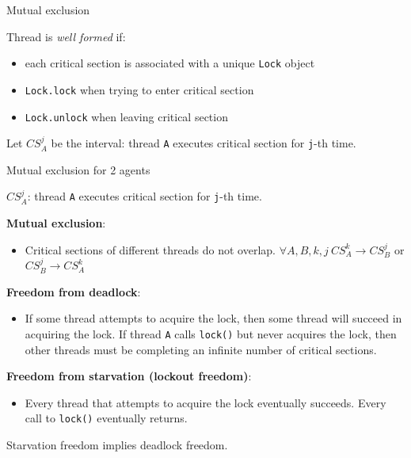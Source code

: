 \begin{frame}[t]{Mutual exclusion}

Thread is \textit{well formed} if:
\begin{itemize}
  \item each critical section is associated with a unique \texttt{Lock} object
  \item \texttt{Lock.lock} when trying to enter critical section
  \item \texttt{Lock.unlock} when leaving critical section
\end{itemize}

Let $CS_{A}^{j}$ be the interval: thread \texttt{A} executes critical section for \texttt{j}-th time.

\end{frame}

\begin{frame}{Mutual exclusion for 2 agents}

$CS_{A}^{j}$: thread \texttt{A} executes critical section for \texttt{j}-th time.

\pause

\textbf{Mutual exclusion}:
\begin{itemize}
  \item Critical sections of different threads do not overlap. \pause
   $\forall A, B, k, j \ CS_{A}^{k} \rightarrow CS_{B}^{j}$ or $CS_{B}^{j} \rightarrow CS_{A}^{k}$
\end{itemize}

\pause
\textbf{Freedom from deadlock}:
\begin{itemize}
  \item If some thread attempts to acquire the lock, then some thread will succeed in acquiring the lock. If thread \texttt{A} calls \texttt{lock()}
  but never acquires the lock, then other threads must be completing an infinite number of critical sections.
\end{itemize}

\pause

\textbf{Freedom from starvation (lockout freedom)}:
\begin{itemize}
  \item Every thread that attempts to acquire the lock eventually succeeds. Every call to \texttt{lock()} eventually returns.
\end{itemize}

\pause

\begin{theorem}
  Starvation freedom implies deadlock freedom.
\end{theorem} 
\end{frame}

